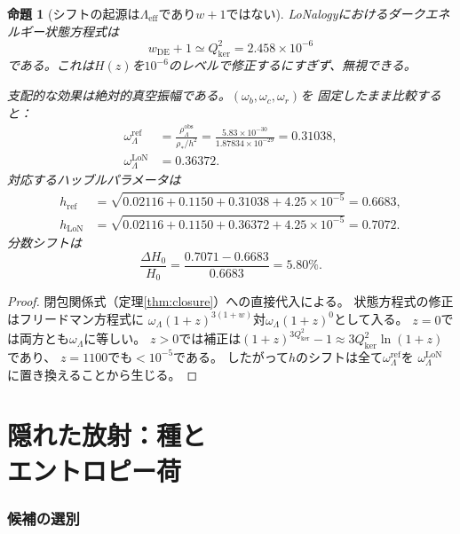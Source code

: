 \documentclass[12pt]{article}
\theoremstyle{plain}
\newtheorem{proposition}[theorem]{命題}
\theoremstyle{definition}
\numberwithin{equation}{section}
\newcommand{\kker}{\mathrm{ker}}
\newcommand{\eff}{\mathrm{eff}}
\newcommand{\obs}{\mathrm{obs}}
\newcommand{\LoN}{\mathrm{LoN}}
\begin{document}
\begin{proposition}[シフトの起源は$\Lambda_{\eff}$であり$w+1$ではない]\label{prop:shift}
LoNalogyにおけるダークエネルギー状態方程式は~\cite{ParticleCosmo}
\begin{equation}
w_{\mathrm{DE}}+1 \simeq Q_{\kker}^2 = 2.458\times10^{-6}
\end{equation}
である。これは$H(z)$を$10^{-6}$のレベルで修正するにすぎず、無視できる。

支配的な効果は絶対的真空振幅である。$(\omega_b,\omega_c,\omega_r)$を
固定したまま比較すると：
\begin{align}
\omega_\Lambda^{\mathrm{ref}} &= \frac{\rho_\Lambda^{\obs}}{\rho_*/h^2}
= \frac{5.83\times10^{-30}}{1.87834\times10^{-29}} = 0.31038,\\
\omega_\Lambda^{\LoN} &= 0.36372.
\end{align}
対応するハッブルパラメータは
\begin{align}
h_{\mathrm{ref}} &= \sqrt{0.02116+0.1150+0.31038+4.25\times10^{-5}} = 0.6683,\\
h_{\LoN} &= \sqrt{0.02116+0.1150+0.36372+4.25\times10^{-5}} = 0.7072.
\end{align}
分数シフトは
\begin{equation}
\boxed{\frac{\Delta H_0}{H_0} = \frac{0.7071-0.6683}{0.6683} = 5.80\%.}
\end{equation}
\end{proposition}

\begin{proof}
閉包関係式（定理\ref{thm:closure}）への直接代入による。
状態方程式の修正はフリードマン方程式に
$\omega_\Lambda(1+z)^{3(1+w)}$対$\omega_\Lambda(1+z)^0$として入る。
$z=0$では両方とも$\omega_\Lambda$に等しい。
$z>0$では補正は$(1+z)^{3Q_{\kker}^2}-1\approx 3Q_{\kker}^2\ln(1+z)$であり、
$z=1100$でも$<10^{-5}$である。
したがって$h$のシフトは全て$\omega_\Lambda^{\mathrm{ref}}$を
$\omega_\Lambda^{\LoN}$に置き換えることから生じる。
\end{proof}


\part{隠れた放射：種と\protect\\エントロピー荷}

\section{候補の選別}\label{sec:candidates}
\end{document}
